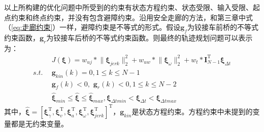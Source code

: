 \documentclass[master,academic]{ysuthesis} %
\begin{document}
		以上所构建的优化问题中所受到的约束有状态方程约束、状态受限、输入受限、起点约束和终点约束，并没有包含避障约束。沿用安全走廊的方法，和第三章中式（\ref{eq:走廊约束}）一样，避障约束是不等式的形式。假设$\bm{g}_{f}$为铰接车前桥的不等式约束函数，$\bm{g}_{r}$为铰接车后桥的不等式约束函数。则最终的轨迹规划问题可以表示为：
		\begin{equation}
			\begin{aligned}
			&J\left( \bm{\xi} \right) =w_{uj}*\lVert \bm{\xi} _{jerk} \rVert _{2}^{2}+w_{uw}*\lVert \bm{\xi} _{\omega} \rVert _{2}^{2}+w_t*\bm{I}_{N-1}^{\mathrm{T}}\bm{\xi} _{\Delta t}\\
			s.t.\ \ &\bm{g}_{kin}\left( k \right) =0,1\leq k\leq N-1\\
			&\bm{g}_{f}\left( k \right) <0,\,\,\bm{g}_{r}\left( k \right) <0,1\leq k\leq N-2\\
			&\hat{\bm{\xi}}_{min}\le \hat{\bm{\xi}}\le \hat{\bm{\xi}}_{max},\bm{\xi} _{\Delta tmin}<\bm{\xi} _{\Delta t}<\bm{\xi} _{\Delta tmax}
			\end{aligned}   
		\end{equation}
		其中，$\hat{\bm{\xi}}=\left[ \bm{\xi} _{\gamma}^{\mathrm{T}},\bm{\xi} _{v}^{\mathrm{T}},\bm{\xi} _{a}^{\mathrm{T}},\bm{\xi} _{\omega}^{\mathrm{T}},\bm{\xi} _{jerk}^{\mathrm{T}} \right] ^{\mathrm{T}}$，$\bm{g}_{kin}$是状态方程约束。方程约束中未提到的变量都是无约束变量。

		\newpage
		\vspace*{-1.5em}
\end{document}

